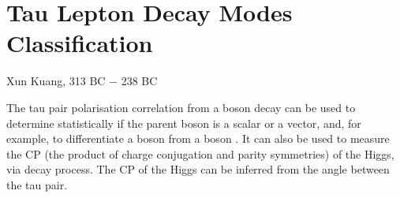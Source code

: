 \chapter{Tau Lepton Decay Modes Classification}
\label{chap:Tau}

%
{Xun Kuang, 313 BC $-$ 238 BC}%

The tau pair polarisation correlation from a boson decay can be used to determine statistically if the parent boson is a  scalar or a vector, and, for example, to differentiate a \PH boson from  a \PZ boson \cite{Bullock:1991my}. It can also be used to measure the CP (the product of charge conjugation and parity symmetries) of the Higgs, via \HiggsToTauTau decay process\cite{Berge:2015nua}. The CP of the Higgs can be inferred from the angle between the tau pair.

